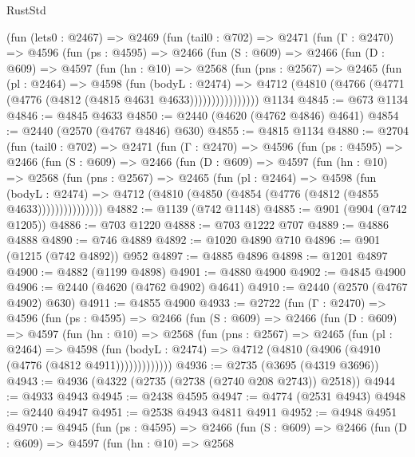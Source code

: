 \begin{lexlean}{RustStd}
\begin{coremodule}
    (fun (lets0 : @2467) =>
    @2469
      (fun (tail0 : @702) =>
      @2471
        (fun (Γ : @2470) =>
        @4596
          (fun (ps : @4595) =>
          @2466
            (fun (S : @609) =>
            @2466
              (fun (D : @609) =>
              @4597
                (fun (hn : @10) =>
                @2568
                  (fun (pns : @2567) =>
                  @2465
                    (fun (pl : @2464) =>
                    @4598
                      (fun (bodyL : @2474) =>
                      @4712 (@4810 (@4766 (@4771 (@4776 (@4812 (@4815 @4631 @4633))))))))))))))))
    @1134
@4845 := @673 @1134
@4846 := @4845 @4633
@4850 := @2440 (@4620 (@4762 @4846) @4641)
@4854 := @2440 (@2570 (@4767 @4846) @630)
@4855 := @4815 @1134
@4880 := @2704
    (fun (tail0 : @702) =>
    @2471
      (fun (Γ : @2470) =>
      @4596
        (fun (ps : @4595) =>
        @2466
          (fun (S : @609) =>
          @2466
            (fun (D : @609) =>
            @4597
              (fun (hn : @10) =>
              @2568
                (fun (pns : @2567) =>
                @2465
                  (fun (pl : @2464) =>
                  @4598
                    (fun (bodyL : @2474) =>
                    @4712 (@4810 (@4850 (@4854 (@4776 (@4812 (@4855 @4633)))))))))))))))
@4882 := @1139 (@742 @1148)
@4885 := @901 (@904 (@742 @1205))
@4886 := @703 @1220
@4888 := @703 @1222 @707
@4889 := @4886 @4888
@4890 := @746 @4889
@4892 := @1020 @4890 @710
@4896 := @901 (@1215 (@742 @4892)) @952
@4897 := @4885 @4896
@4898 := @1201 @4897
@4900 := @4882 (@1199 @4898)
@4901 := @4880 @4900
@4902 := @4845 @4900
@4906 := @2440 (@4620 (@4762 @4902) @4641)
@4910 := @2440 (@2570 (@4767 @4902) @630)
@4911 := @4855 @4900
@4933 := @2722
    (fun (Γ : @2470) =>
    @4596
      (fun (ps : @4595) =>
      @2466
        (fun (S : @609) =>
        @2466
          (fun (D : @609) =>
          @4597
            (fun (hn : @10) =>
            @2568
              (fun (pns : @2567) =>
              @2465
                (fun (pl : @2464) =>
                @4598
                  (fun (bodyL : @2474) =>
                  @4712 (@4810 (@4906 (@4910 (@4776 (@4812 @4911)))))))))))))
@4936 := @2735 (@3695 (@4319 @3696))
@4943 := @4936 (@4322 (@2735 (@2738 (@2740 @208 @2743)) @2518))
@4944 := @4933 @4943
@4945 := @2438 @4595
@4947 := @4774 (@2531 @4943)
@4948 := @2440 @4947
@4951 := @2538 @4943 @4811 @4911
@4952 := @4948 @4951
@4970 := @4945
    (fun (ps : @4595) =>
    @2466
      (fun (S : @609) =>
      @2466
        (fun (D : @609) =>
        @4597
          (fun (hn : @10) =>
          @2568

\end{coremodule}
\end{lexlean}
